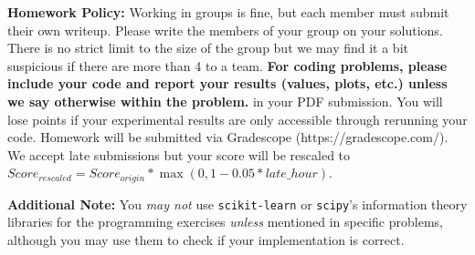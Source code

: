 \documentclass{hw_cl}
\begin{document}

\maketitle
 \textbf{Homework Policy:} Working in groups is fine, but each member must submit their own writeup. Please write the members of your group on your solutions. There is no strict limit to the size of the group but we may find it a bit suspicious if there are more than 4 to a team. \textbf{For coding problems, please include your code and report your results (values, plots, etc.) unless we say otherwise within the problem.} in your PDF submission. You will lose points if your experimental results are only accessible through rerunning your code. Homework will be submitted via Gradescope (https://gradescope.com/). We accept late submissions but your score will be rescaled to $Score_{rescaled} = Score_{origin} * \max(0, 1 - 0.05 * late\_hour)$.
\vspace{1em}


\textbf{Additional Note:} You \emph{may not} use \texttt{scikit-learn} or \texttt{scipy}'s information theory libraries for the programming exercises \emph{unless} mentioned in specific problems, although you may use them to check if your implementation is correct.




\end{document}
